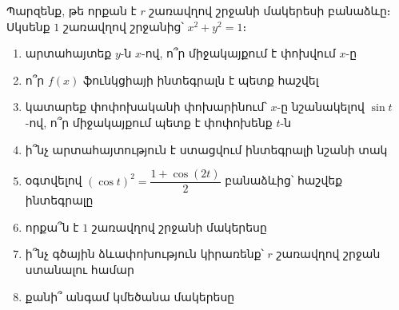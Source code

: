 \begin{problem}
Պարզենք, թե որքան է $r$ շառավղով շրջանի մակերեսի բանաձևը։ Սկսենք $1$ շառավղով շրջանից՝ $x^2+y^2=1$։
\begin{enumerate}[label={\alph*}․]
\item արտահայտեք $y$-ն $x$-ով, ո՞ր միջակայքում է փոխվում $x$-ը
\item ո՞ր $f(x)$ ֆունկցիայի ինտեգրալն է պետք հաշվել
\item կատարեք փոփոխականի փոխարինում՝ $x$-ը նշանակելով $\sin t$-ով, ո՞ր միջակայքում պետք է փոփոխենք $t$-ն
\item ի՞նչ արտահայտություն է ստացվում ինտեգրալի նշանի տակ
\item օգտվելով $(\cos t)^2=\dfrac{1+\cos(2t)}{2}$ բանաձևից՝ հաշվեք ինտեգրալը
\item որքա՞ն է $1$ շառավղով շրջանի մակերեսը
\item ի՞նչ գծային ձևափոխություն կիրառենք՝ $r$ շառավղով շրջան ստանալու համար
\item քանի՞ անգամ կմեծանա մակերեսը
\end{enumerate}
\end{problem}
